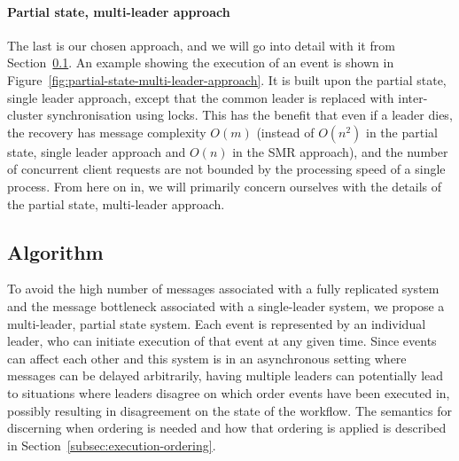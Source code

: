 \documentclass{article}
\begin{document}
	\paragraph{Partial state, multi-leader approach}
	The last is our chosen approach, and we will go into detail with it from Section~\ref{subsec:algorithm}.
    An example showing the execution of an event is shown in Figure~\ref{fig:partial-state-multi-leader-approach}.
	It is built upon the partial state, single leader approach, except that the common leader is replaced with inter-cluster synchronisation using locks.
	This has the benefit that even if a leader dies, the recovery has message complexity $O(m)$ (instead of $O(n^2)$ in the partial state, single leader approach and $O(n)$ in the SMR approach), and the number of concurrent client requests are not bounded by the processing speed of a single process.
	From here on in, we will primarily concern ourselves with the details of the partial state, multi-leader approach.

	\subsection{Algorithm}
	\label{subsec:algorithm}

	To avoid the high number of messages associated with a fully replicated system and the message bottleneck associated with a single-leader system, we propose a multi-leader, partial state system.
	Each event is represented by an individual leader, who can initiate execution of that event at any given time.
	Since events can affect each other and this system is in an asynchronous setting where messages can be delayed arbitrarily, having multiple leaders can potentially lead to situations where leaders disagree on which order events have been executed in, possibly resulting in disagreement on the state of the workflow.
	The semantics for discerning when ordering is needed and how that ordering is applied is described in Section~\ref{subsec:execution-ordering}.
\end{document}
